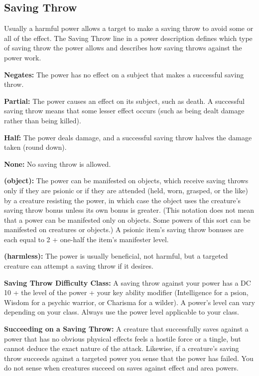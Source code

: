 \subsection{Saving Throw}
Usually a harmful power allows a target to make a saving throw to avoid some or all of the effect. The Saving Throw line in a power description defines which type of saving throw the power allows and describes how saving throws against the power work.

\textbf{Negates:} The power has no effect on a subject that makes a successful saving throw.

\textbf{Partial:} The power causes an effect on its subject, such as death. A successful saving throw means that some lesser effect occurs (such as being dealt damage rather than being killed).

\textbf{Half:} The power deals damage, and a successful saving throw halves the damage taken (round down).

\textbf{None:} No saving throw is allowed.

\textbf{(object):} The power can be manifested on objects, which receive saving throws only if they are psionic or if they are attended (held, worn, grasped, or the like) by a creature resisting the power, in which case the object uses the creature's saving throw bonus unless its own bonus is greater. (This notation does not mean that a power can be manifested only on objects. Some powers of this sort can be manifested on creatures or objects.) A psionic item's saving throw bonuses are each equal to 2 + one-half the item's manifester level.

\textbf{(harmless):} The power is usually beneficial, not harmful, but a targeted creature can attempt a saving throw if it desires.

\textbf{Saving Throw Difficulty Class:} A saving throw against your power has a DC 10 + the level of the power + your key ability modifier (Intelligence for a psion, Wisdom for a psychic warrior, or Charisma for a wilder). A power's level can vary depending on your class. Always use the power level applicable to your class.

\textbf{Succeeding on a Saving Throw:} A creature that successfully saves against a power that has no obvious physical effects feels a hostile force or a tingle, but cannot deduce the exact nature of the attack. Likewise, if a creature's saving throw succeeds against a targeted power you sense that the power has failed. You do not sense when creatures succeed on saves against effect and area powers.

